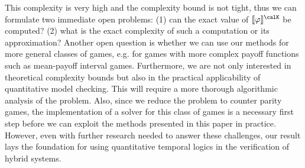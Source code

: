 \documentclass[fleqn,envcountsame]{LMCS}
\newcommand{\semk}[1]{\ensuremath{\llbracket#1\rrbracket^{\calK}}}
\renewcommand\phi{\varphi}
\begin{document}
This complexity is very high and the complexity bound is not tight,
thus we can formulate two immediate open problems: (1) can the exact
value of $\semk{\phi}$ be computed? (2) what is the exact complexity
of such a computation or its approximation? 
Another open question is whether we can use our methods for more general
classes of games, e.g. for games with more complex payoff functions such as
mean-payoff interval games. Furthermore, we are not only interested in
theoretical complexity bounds but also in the practical applicability of
quantitative model checking. This will require a more thorough algorithmic
analysis of the problem. Also, since we reduce the problem to counter parity
games, the implementation of a solver for this class of games is a necessary
first step before we can exploit the methods presented in this paper in
practice. However, even with further research needed to answer these challenges,
our result lays the foundation for using quantitative temporal logics in
the verification of hybrid systems.
\end{document}
